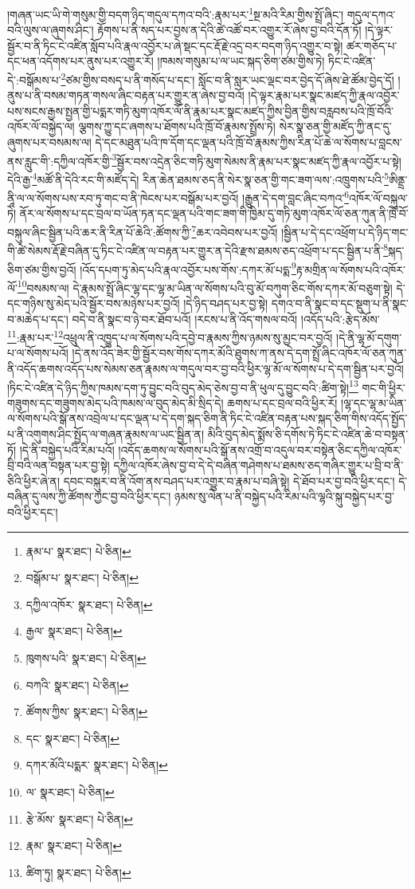 །གཞན་ཡང་ཡི་གེ་གསུམ་གྱི་བདག་ཉིད་གདུལ་དཀའ་བའི་:རྣམ་པར་\footnote{རྣམ་པ་  སྣར་ཐང་།  པེ་ཅིན། }སྔ་མའི་རིམ་གྱིས་སྤྲོ་ཞིང་། གདུལ་དཀའ་བའི་ལུས་ལ་ཞུགས་ཤིང་། རྟོགས་པ་ནི་སད་པར་བྱས་ན་དེའི་ཚེ་འཚོ་བར་འགྱུར་རོ་ཞེས་བྱ་བའི་དོན་ཏོ། །དེ་ལྟར་སྦྱོར་བ་ནི་ཏིང་ངེ་འཛིན་སློབ་པའི་རྣལ་འབྱོར་པ་ཞེ་སྡང་དང་རྡོ་རྗེ་འདྲ་བར་བདག་ཉིད་འགྱུར་བ་སྟེ། ཚར་གཅོད་པ་དང་ཕན་འདོགས་པར་ནུས་པར་འགྱུར་རོ། །ཁམས་གསུམ་པ་ལ་ཡང་སྐད་ཅིག་ཙམ་གྱིས་ཏེ། ཏིང་ངེ་འཛིན་དེ་:བསྒོམས་པ་\footnote{བསྒོམ་པ་  སྣར་ཐང་།  པེ་ཅིན། }ཙམ་གྱིས་བསད་པ་ནི་གསོད་པ་དང་། སློང་བ་ནི་སླར་ཡང་ལྡང་བར་བྱེད་དོ་ཞེས་ཐེ་ཚོམ་བྱེད་དོ། །ནུས་པ་ནི་བསམ་གཏན་གསལ་ཞིང་བརྟན་པར་གྱུར་ན་ཞེས་བྱ་བའོ། །དེ་ལྟར་རྣམ་པར་སྣང་མཛད་ཀྱི་རྣལ་འབྱོར་པས་སངས་རྒྱས་སྤྱན་གྱི་པདྨར་གཏི་མུག་འཁོར་ལོ་ནི་རྣམ་པར་སྣང་མཛད་ཀྱིས་བྱིན་གྱིས་བརླབས་པའི་ཁྲོ་བོའི་འཁོར་ལོ་བསྐྱེད་ལ། ལྕགས་ཀྱུ་དང་ཞགས་པ་ཐོགས་པའི་ཁྲོ་བོ་རྣམས་སྤྲོས་ཏེ། སེར་སྣ་ཅན་གྱི་མཛོད་ཀྱི་ནང་དུ་ཞུགས་པར་བསམས་ལ། དེ་དང་མཐུན་པའི་ཁ་དོག་དང་ལྡན་པའི་ཁྲོ་བོ་རྣམས་ཀྱིས་རིན་པོ་ཆེ་ལ་སོགས་པ་བླངས་ནས་རླུང་གི་:དཀྱིལ་འཁོར་གྱི་\footnote{དཀྱིལ་འཁོར་  སྣར་ཐང་།  པེ་ཅིན། }སྦྱོར་བས་འདྲེན་ཅིང་གཏི་མུག་སེམས་ནི་རྣམ་པར་སྣང་མཛད་ཀྱི་རྣལ་འབྱོར་པ་སྟེ། དེའི་རྒྱ་\footnote{རྒྱལ་  སྣར་ཐང་།  པེ་ཅིན། }མཚོ་ནི་དེའི་རང་གི་མཛོད་དེ། རིན་ཆེན་ཐམས་ཅད་ནི་སེར་སྣ་ཅན་གྱི་གང་ཟག་ལས་:འཁྲུགས་པའི་\footnote{ཁུགས་པའི་  སྣར་ཐང་།  པེ་ཅིན། }ཨིནྡྲ་ནཱི་ལ་ལ་སོགས་པས་རབ་ཏུ་གང་བ་ནི་ཁེངས་པར་བསྒོམ་པར་བྱའོ། །རྒྱུན་དེ་དག་བླང་ཞིང་བཀའ་\footnote{བཀའི་  སྣར་ཐང་།  པེ་ཅིན། }འཁོར་ལོ་བསྐུལ་ཏེ། ནོར་ལ་སོགས་པ་དང་བྲལ་བ་ཡོན་ཏན་དང་ལྡན་པའི་གང་ཟག་གི་ཁྱིམ་དུ་གཏི་མུག་འཁོར་ལོ་ཅན་ཀུན་ནི་ཁྲོ་བོ་བསྐུལ་ཞིང་སྦྱིན་པའི་ཆར་ནི་རིན་པོ་ཆེའི་:ཚོགས་ཀྱི་\footnote{ཚོགས་ཀྱིས་  སྣར་ཐང་།  པེ་ཅིན། }ཆར་འབེབས་པར་བྱའོ། །སྦྱིན་པ་དེ་དང་འཕྲོག་པ་དེ་ཉིད་གང་གི་ཚེ་སེམས་རྡོ་རྗེ་བཞིན་དུ་ཏིང་ངེ་འཛིན་ལ་བརྟན་པར་གྱུར་ན་དེའི་རྫས་ཐམས་ཅད་འཕྲོག་པ་དང་སྦྱིན་པ་ནི་\footnote{དང་  སྣར་ཐང་།  པེ་ཅིན། }སྐད་ཅིག་ཙམ་གྱིས་བྱའོ། །འོད་དཔག་ཏུ་མེད་པའི་རྣལ་འབྱོར་པས་གོས་:དཀར་མོ་པདྨ་\footnote{དཀར་མོའི་པདྨར་  སྣར་ཐང་།  པེ་ཅིན། }རྟ་མགྲིན་ལ་སོགས་པའི་འཁོར་ལོ་\footnote{ལ་  སྣར་ཐང་།  པེ་ཅིན། }བསམས་ལ། དེ་རྣམས་སྤྲོ་ཞིང་ལྷ་དང་ལྷ་མ་ཡིན་ལ་སོགས་པའི་བུ་མོ་བཀུག་ཅིང་གོས་དཀར་མོ་བཅུག་སྟེ། དེ་དང་གཉིས་སུ་མེད་པའི་སྦྱོར་བས་མཉེས་པར་བྱའོ། །དེ་ཉིད་བཤད་པར་བྱ་སྟེ། དགའ་བ་ནི་སྣང་བ་དང་སྡུག་པ་ནི་སྣང་བ་མཆེད་པ་དང་། བདེ་བ་ནི་སྣང་བ་ཉེ་བར་ཐོབ་པའོ། །རངས་པ་ནི་འོད་གསལ་བའོ། །འདོད་པའི་:རྩེད་མོས་\footnote{རྩེ་མོས་  སྣར་ཐང་།  པེ་ཅིན། }:རྣམ་པར་\footnote{རྣམ་  སྣར་ཐང་།  པེ་ཅིན། }འཕྲུལ་ནི་འཁྱུད་པ་ལ་སོགས་པའི་དབྱེ་བ་རྣམས་ཀྱིས་ཉམས་སུ་མྱང་བར་བྱའོ། །དེ་ནི་ལྷ་མོ་དགུག་པ་ལ་སོགས་པའོ། །དེ་ནས་འོད་ཟེར་གྱི་སྦྱོར་བས་གོས་དཀར་མོའི་ཐུགས་ཀ་ནས་དེ་དག་སྤྲོ་ཞིང་འཁོར་ལོ་ཅན་ཀུན་ནི་འདོད་ཆགས་འདོད་པས་སེམས་ཅན་རྣམས་ལ་གདུལ་བར་བྱ་བའི་ཕྱིར་ལྷ་མོ་ལ་སོགས་པ་དེ་དག་སྦྱིན་པར་བྱའོ། །ཏིང་ངེ་འཛིན་དེ་ཉིད་ཀྱིས་ཁམས་དག་ཏུ་བྱུང་བའི་བུད་མེད་ཅེས་བྱ་བ་ནི་ཕུལ་དུ་བྱུང་བའི་:ཚིག་སྟེ།\footnote{ཚིག་ཏུ།  སྣར་ཐང་།  པེ་ཅིན། } གང་གི་ཕྱིར་གཟུགས་དང་གཟུགས་མེད་པའི་ཁམས་ལ་བུད་མེད་མི་སྲིད་དེ། ཆགས་པ་དང་བྲལ་བའི་ཕྱིར་རོ། །ལྷ་དང་ལྷ་མ་ཡིན་ལ་སོགས་པའི་སྒོ་ནས་འབྲེལ་པ་དང་ལྡན་པ་དེ་དག་སྐད་ཅིག་ནི་ཏིང་ངེ་འཛིན་བརྟན་པས་སྐད་ཅིག་གིས་འདོད་སྤྱོད་པ་ནི་འགུགས་ཤིང་སྤྱོད་ལ་གཞན་རྣམས་ལ་ཡང་སྦྱིན་ན། མིའི་བུད་མེད་སྨོས་ཅི་དགོས་ཏེ་ཏིང་ངེ་འཛིན་ཆེ་བ་བསྟན་ཏོ། །དེ་ནི་བསྐྱེད་པའི་རིམ་པའོ། །འདོད་ཆགས་ལ་སོགས་པའི་སྒོ་ནས་འགྲོ་བ་འདུལ་བར་བསྟེན་ཅིང་དཀྱིལ་འཁོར་བྲི་བའི་ལན་བསྟན་པར་བྱ་སྟེ། དཀྱིལ་འཁོར་ཞེས་བྱ་བ་དེ་དེ་བཞིན་གཤེགས་པ་ཐམས་ཅད་གཞིར་གྱུར་པ་བྲི་བ་ནི་ཅིའི་ཕྱིར་ཞེ་ན། དབང་བསྐུར་བ་ནི་འོག་ནས་བཤད་པར་འགྱུར་བ་རྣམ་པ་བཞི་སྟེ། དེ་ཐོབ་པར་བྱ་བའི་ཕྱིར་དང་། དེ་བཞིན་དུ་ལས་ཀྱི་ཚོགས་ཀྱང་བྱ་བའི་ཕྱིར་དང་། ཉམས་སུ་ལེན་པ་ནི་བསྐྱེད་པའི་རིམ་པའི་ལྷའི་སྐུ་བསྐྱེད་པར་བྱ་བའི་ཕྱིར་དང་། 